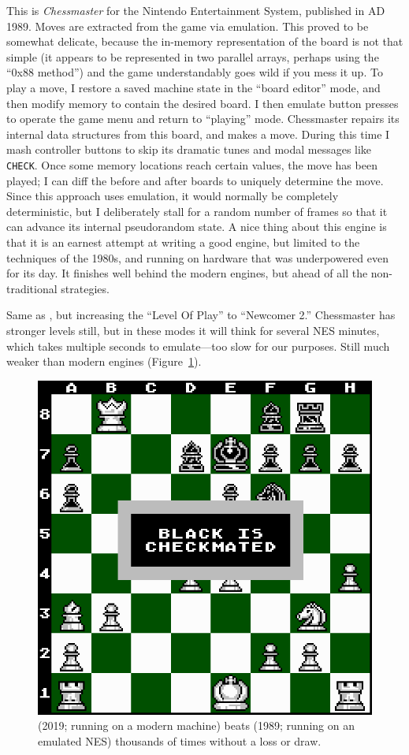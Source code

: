 \documentclass[10pt,preprint,twocolumn]{acmart}
\begin{document}
 This is {\it Chessmaster} for
the Nintendo Entertainment System, published in AD 1989. Moves are
extracted from the game via emulation. This proved to be somewhat
delicate, because the in-memory representation of the board is not
that simple (it appears to be represented in two parallel arrays,
perhaps using the ``0x88 method'') and the game understandably goes
wild if you mess it up. To play a move, I restore a saved machine
state in the ``board editor'' mode, and then modify memory to contain
the desired board. I then emulate button presses to operate the game
menu and return to ``playing'' mode. Chessmaster repairs its internal
data structures from this board, and makes a move. During this time I
mash controller buttons to skip its dramatic tunes and modal messages
like \verb+CHECK+. Once some memory locations reach certain values,
the move has been played; I can diff the before and after boards to
uniquely determine the move. Since this approach uses emulation, it
would normally be completely deterministic, but I deliberately stall
for a random number of frames so that it can advance its internal
pseudorandom state. A nice thing about this engine is that it is an
earnest attempt at writing a good engine, but limited to the
techniques of the 1980s, and running on hardware that was underpowered
even for its day. It finishes well behind the modern engines, but
ahead of all the non-traditional strategies. \traditional

 Same as
, but increasing the ``Level Of Play'' to
``Newcomer 2.'' Chessmaster has stronger levels still, but in these
modes it will think for several NES minutes, which takes multiple
seconds to emulate---too slow for our purposes. Still much
weaker than modern engines (Figure~\ref{fig:chessmaster}).
\traditional

\begin{figure}[ht]
  \includegraphics[width=0.75 \linewidth]{chessmaster}
  \caption{ (2019; running on a modern machine) beats
     (1989; running on an emulated NES)
    thousands of times without a loss or draw.} \label{fig:chessmaster}
\end{figure}
\end{document}
